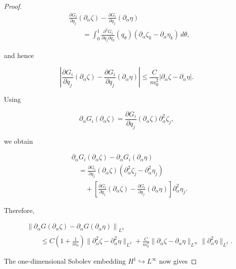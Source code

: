 \documentclass{article}[12pt]
\theoremstyle{Theorem}
\begin{document}
\begin{proof}
$$
\begin{aligned}
    &\frac{\partial G_i}{\partial q_j}
        (\partial_\alpha\zeta)
    -
    \frac{\partial G_i}{\partial q_j}
        (\partial_\alpha\eta)\\
    &\qquad=
    \int_0^1
    \frac{\partial^2G_i}{\partial q_j\partial q_k}
        (q_\theta)
    \left(
        \partial_\alpha\zeta_k
        -
        \partial_\alpha\eta_k
    \right)\,d\theta,
\end{aligned}
$$

and hence

$$
    \left|
    \frac{\partial G_i}{\partial q_j}
        (\partial_\alpha\zeta)
    -
    \frac{\partial G_i}{\partial q_j}
        (\partial_\alpha\eta)
    \right|
    \leq
    \frac{C}{m_0^2}
    |\partial_\alpha\zeta-\partial_\alpha\eta|.
$$

Using

$$
    \partial_\alpha G_i(\partial_\alpha\zeta)
    =
    \frac{\partial G_i}{\partial q_j}
        (\partial_\alpha\zeta)
    \partial_\alpha^2\zeta_j,
$$

we obtain

$$
\begin{aligned}
    &\partial_\alpha G_i(\partial_\alpha\zeta)
    -
    \partial_\alpha G_i(\partial_\alpha\eta)\\
    &\quad=
    \frac{\partial G_i}{\partial q_j}
        (\partial_\alpha\zeta)
    \left(
        \partial_\alpha^2\zeta_j
        -
        \partial_\alpha^2\eta_j
    \right)\\
    &\qquad+
    \left[
        \frac{\partial G_i}{\partial q_j}
            (\partial_\alpha\zeta)
        -
        \frac{\partial G_i}{\partial q_j}
            (\partial_\alpha\eta)
    \right]
    \partial_\alpha^2\eta_j.
\end{aligned}
$$

Therefore,

$$
\begin{aligned}
    &
    \left\|
        \partial_\alpha G(\partial_\alpha\zeta)
        -
        \partial_\alpha G(\partial_\alpha\eta)
    \right\|_{L^2}\\
    &\qquad\leq
    C\left(1+\frac1{m_0}\right)
    \|\partial_\alpha^2\zeta-\partial_\alpha^2\eta\|_{L^2}
    +
    \frac{C}{m_0^2}
    \|\partial_\alpha\zeta-\partial_\alpha\eta\|_{L^\infty}
    \|\partial_\alpha^2\eta\|_{L^2}.
\end{aligned}
$$

The one-dimensional Sobolev embedding \(H^1\hookrightarrow L^\infty\) now gives


\end{proof}
\end{document}
